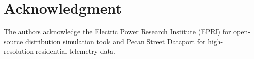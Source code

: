 \documentclass[journal]{IEEEtran}
\begin{document}
\section*{Acknowledgment}
The authors acknowledge the Electric Power Research Institute (EPRI) for open-source distribution simulation tools and Pecan Street Dataport for high-resolution residential telemetry data.



\end{document}
